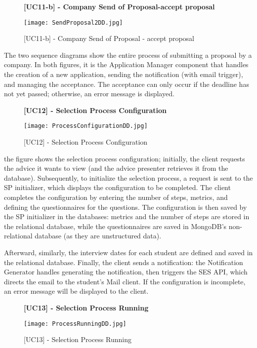 		\begin{figure}[H]
			\centering
			{\bfseries [UC11-b] - Company Send of Proposal-accept proposal}
			\caption{[UC11-b] - Company Send of Proposal - accept proposal}
			\texttt{[image: SendProposal2DD.jpg]}
			
		\end{figure}
		
		
		
		The two sequence diagrams show the entire process of submitting a proposal by a company. In both figures, it is the Application Manager component that handles the creation of a new application, sending the notification (with email trigger), and managing the acceptance. The acceptance can only occur if the deadline has not yet passed; otherwise, an error message is displayed.
		
		
		
		
		
		
		
		\begin{figure}[H]
			\centering
			{\bfseries [UC12] - Selection Process Configuration}
			\caption{[UC12] - Selection Process Configuration}
			\texttt{[image: ProcessConfigurationDD.jpg]}
			
		\end{figure}
		
		
		the figure shows the selection process configuration; initially, the client requests the advice it wants to view (and the advice presenter retrieves it from the database). Subsequently, to initialize the selection process, a request is sent to the SP initializer, which displays the configuration to be completed. The client completes the configuration by entering the number of steps, metrics, and defining the questionnaires for the questions. The configuration is then saved by the SP initializer in the databases: metrics and the number of steps are stored in the relational database, while the questionnaires are saved in MongoDB’s non-relational database (as they are unstructured data).
		
		Afterward, similarly, the interview dates for each student are defined and saved in the relational database. Finally, the client sends a notification: the Notification Generator handles generating the notification, then triggers the SES API, which directs the email to the student's Mail client. If the configuration is incomplete, an error message will be displayed to the client.
		
		
		\begin{figure}[H]
			\centering
			{\bfseries [UC13] - Selection Process Running}
			\caption{[UC13] - Selection Process Running}
			\texttt{[image: ProcessRunningDD.jpg]}
			
		\end{figure}
		
